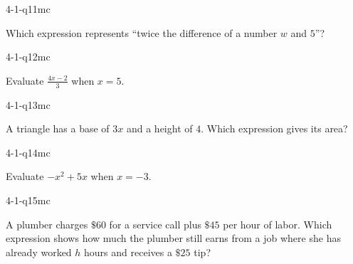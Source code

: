 \begin{practiceQuestion}{4-1-q11}{mc}
\begin{questionText}
Which expression represents ``twice the difference of a number $w$ and $5$''?
\end{questionText}
\end{practiceQuestion}

\begin{practiceQuestion}{4-1-q12}{mc}
\begin{questionText}
Evaluate $\frac{4x - 2}{3}$ when $x = 5$.
\end{questionText}
\end{practiceQuestion}

\begin{practiceQuestion}{4-1-q13}{mc}
\begin{questionText}
A triangle has a base of $3x$ and a height of $4$. Which expression gives its area?
\end{questionText}
\end{practiceQuestion}

\begin{practiceQuestion}{4-1-q14}{mc}
\begin{questionText}
Evaluate $-x^2 + 5x$ when $x = -3$.
\end{questionText}
\end{practiceQuestion}

\begin{practiceQuestion}{4-1-q15}{mc}
\begin{questionText}
A plumber charges $\$60$ for a service call plus $\$45$ per hour of labor. Which expression shows how much the plumber still earns from a job where she has already worked $h$ hours and receives a $\$25$ tip?
\end{questionText}
\end{practiceQuestion}

